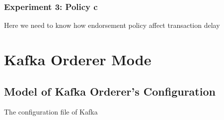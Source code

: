 \documentclass[10pt,journal,compsoc, twoside]{IEEEtran}
\begin{document}
\subsubsection{Experiment 3: Policy c}

Here we need to know how endorsement policy affect transaction delay





\section{Kafka Orderer Mode}


\subsection{Model of Kafka Orderer's Configuration}

The configuration file of Kafka




\ifCLASSOPTIONcaptionsoff
  \newpage
\fi





\vspace{240pt}
\end{document}
